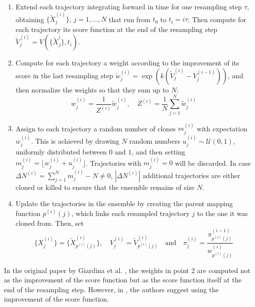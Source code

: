 \begin{enumerate}
    \item Extend each trajectory integrating forward in time for one resampling step $\tau$, obtaining $\{\tilde{X}^{(i)}_j\}, \, j = 1, \ldots, N$ that run from $t_0$ to $t_i = i\tau$. Then compute for each trajectory its score function at the end of the resampling step $\tilde{V}_j^{(i)} = V(\{\tilde{X}_j^{i}\}, t_i)$.

    \item Compute for each trajectory a weight according to the improvement of its score in the last resampling step $\tilde{w}_j^{(i)} = \exp\left( k\left( \tilde{V}_j^{(i)} - V_j^{(i-1)} \right) \right) $, and then normalize the weights so that they sum up to $N$:
    $$w_j^{(i)} = \frac{1}{Z^{(i)}} \tilde{w}_j^{(i)}, \quad Z^{(i)} = \frac{1}{N}\sum_{j=1}^N \tilde{w}_j^{(i)}$$

    \item Assign to each trajectory a random number of clones $m_j^{(i)}$ with expectation $w_j^{(i)}$. This is achieved by drawing $N$ random numbers $u_j^{(i)} \sim \mathcal{U}(0, 1)$, uniformly distributed between $0$ and $1$, and then setting $m_j^{(i)} = \lfloor w_j^{(i)} + u_j^{(i)} \rfloor$. Trajectories with $m_j^{(i)} = 0$ will be discarded. In case $\Delta N^{(i)} = \sum_{j=1}^N m_j^{(i)} - N \neq 0$, $|\Delta N^{(i)}|$ additional trajectories are either cloned or killed to ensure that the ensemble remains of size $N$.

    \item Update the trajectories in the ensemble by creating the parent mapping function $p^{(i)}(j)$, which links each resampled trajectory $j$ to the one it was cloned from. Then, set
    $$ \{X^{(i)}_j\} = \{\tilde{X}^{(i)}_{p^{(i)}(j)}\} , \quad V_j^{(i)} = \tilde{V}^{(i)}_{p^{(i)}(j)} \quad \text{and} \quad \pi_j^{(i)} = \frac{\pi_{p^{(i)}(j)}^{(i-1)}}{w^{(i)}_{p^{(i)}(j)}} $$
\end{enumerate}

In the original paper by Giardina et al. \cite{GIA11}, the weights in point 2 are computed not as the improvement of the score function but as the score function itself at the end of the resampling step. However, in \cite{GAR06}, the authors suggest using the improvement of the score function.


